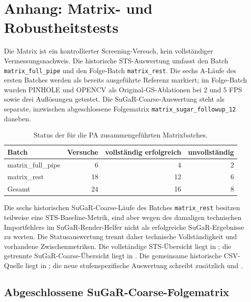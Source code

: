 \section{Anhang: Matrix- und Robustheitstests}

Die Matrix ist ein kontrollierter Screening-Versuch, kein vollständiger
Vermessungsnachweis. Die historische STS-Auswertung umfasst den Batch
\texttt{matrix\_full\_pipe} und den Folge-Batch \texttt{matrix\_rest}. Die
sechs A-Läufe des ersten Batches werden als bereits ausgeführte Referenz
markiert; im Folge-Batch wurden PINHOLE und OPENCV als Original-GS-Ablationen
bei 2 und 5 FPS sowie drei Auflösungen getestet. Die SuGaR-Coarse-Auswertung
steht als separate, inzwischen abgeschlossene Folgematrix
\texttt{matrix\_sugar\_followup\_12} daneben.

\begin{table}[H]
\centering
\small
\begin{tabular}{lrrr}
\toprule
Batch & Versuche & vollständig erfolgreich & unvollständig\\
\midrule
matrix\_full\_pipe & 6 & 4 & 2\\
matrix\_rest & 18 & 12 & 6\\
Gesamt & 24 & 16 & 8\\
\bottomrule
\end{tabular}
\caption{Status der für die PA zusammengeführten Matrixbatches.}
\end{table}

Die sechs historischen SuGaR-Coarse-Läufe des Batches
\texttt{matrix\_rest} besitzen teilweise eine STS-Baseline-Metrik, sind aber
wegen des damaligen technischen Importfehlers im SuGaR-Render-Helfer nicht als
erfolgreiche SuGaR-Ergebnisse zu werten. Die Statusauswertung trennt daher
technische Vollständigkeit und vorhandene Zwischenmetriken. Die vollständige
STS-Übersicht liegt in
;
die getrennte SuGaR-Coarse-Übersicht liegt in
.
Die gemeinsame historische CSV-Quelle liegt in
; die neue
stufenspezifische Auswertung schreibt zusätzlich
 und
.

\subsection*{Abgeschlossene SuGaR-Coarse-Folgematrix}

